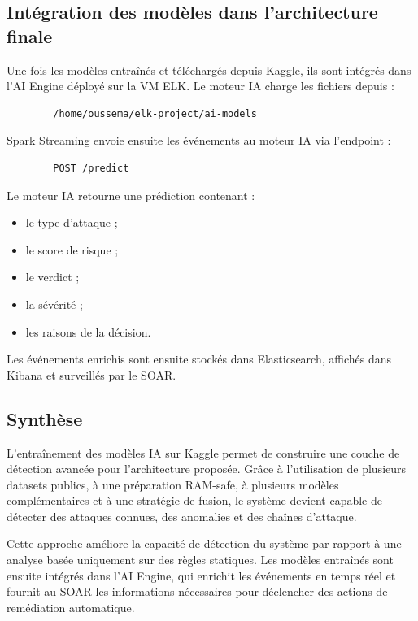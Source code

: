 \documentclass[12pt,a4paper,oneside]{report}
\begin{document}
	\subsection{Intégration des modèles dans l'architecture finale}
	
	Une fois les modèles entraînés et téléchargés depuis Kaggle, ils sont intégrés dans l'AI Engine déployé sur la VM ELK. Le moteur IA charge les fichiers depuis :
	
	\begin{lstlisting}
		/home/oussema/elk-project/ai-models
	\end{lstlisting}
	
	Spark Streaming envoie ensuite les événements au moteur IA via l'endpoint :
	
	\begin{lstlisting}
		POST /predict
	\end{lstlisting}
	
	Le moteur IA retourne une prédiction contenant :
	
	\begin{itemize}
		\item le type d'attaque ;
		\item le score de risque ;
		\item le verdict ;
		\item la sévérité ;
		\item les raisons de la décision.
	\end{itemize}
	
	Les événements enrichis sont ensuite stockés dans Elasticsearch, affichés dans Kibana et surveillés par le SOAR.
\subsection{Synthèse}
	L'entraînement des modèles IA sur Kaggle permet de construire une couche de détection avancée pour l'architecture proposée. Grâce à l'utilisation de plusieurs datasets publics, à une préparation RAM-safe, à plusieurs modèles complémentaires et à une stratégie de fusion, le système devient capable de détecter des attaques connues, des anomalies et des chaînes d'attaque.
	
	Cette approche améliore la capacité de détection du système par rapport à une analyse basée uniquement sur des règles statiques. Les modèles entraînés sont ensuite intégrés dans l'AI Engine, qui enrichit les événements en temps réel et fournit au SOAR les informations nécessaires pour déclencher des actions de remédiation automatique.
	
\end{document}
